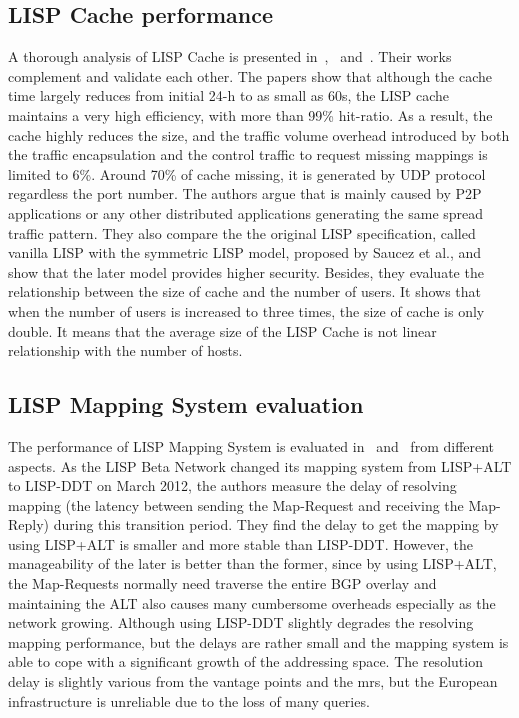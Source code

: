 \subsection{LISP Cache performance}
\label{subsec:lisp_cache}
A thorough analysis of LISP Cache is presented in~\cite{lispCacheCost},~\cite{lispCacheDive} and~\cite{kim2013caching}. Their works complement and validate each other. The papers %
show that although the cache time largely reduces from initial 24-h to as small as 60s, the LISP cache maintains a very high efficiency, with more than 99\% hit-ratio. As a result, the cache highly reduces the size, and the traffic volume overhead introduced by both the traffic encapsulation and the control traffic to request missing mappings is limited to 6\%. Around 70\% of cache missing, it is generated by UDP protocol regardless the port number. The authors argue that is mainly caused by P2P applications or any other distributed applications generating the same spread traffic pattern. They also compare the the original LISP specification, called vanilla LISP with the symmetric LISP model, proposed by Saucez et al., and show that the later model provides higher security. Besides, they evaluate the relationship between the size of cache and the number of users. It shows that when the number of users is increased to three times, the size of cache is only double. It means that the average size of the LISP Cache is not linear relationship with the number of hosts.

\subsection{LISP Mapping System evaluation}
\label{subsec:lisp_mds}
The performance of LISP Mapping System is evaluated in~\cite{lispCCR} and~\cite{coras2014performance} from different aspects. As the LISP Beta Network changed its mapping system from LISP+ALT to LISP-DDT on March  2012, the authors measure the delay of resolving mapping (the latency between sending the Map-Request and receiving the Map-Reply) during this transition period. They find the delay to get the mapping by using LISP+ALT is smaller and more stable than LISP-DDT. However, the manageability of the later is better than the former, since by using LISP+ALT, the Map-Requests normally need traverse the entire BGP overlay and maintaining the ALT also causes many cumbersome overheads especially as the network growing. Although using LISP-DDT slightly degrades the resolving mapping performance, but the delays are rather small and the mapping system is able to cope with a significant growth of the addressing space. The resolution delay is slightly various from the vantage points and the \acrshort{mr}s, but the European infrastructure is unreliable due to the loss of many queries.


